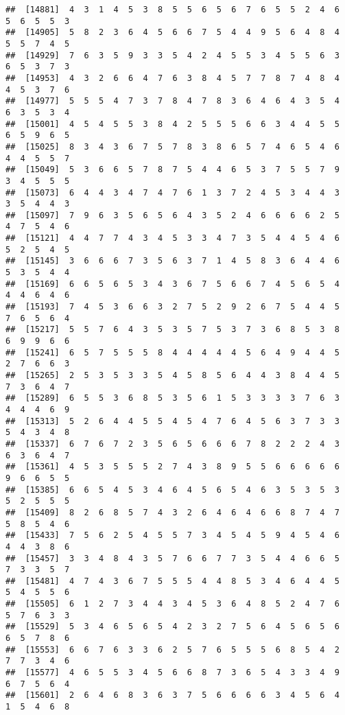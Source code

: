 \documentclass[
]{book}
\begin{document}
\begin{verbatim}
##  [14881]  4  3  1  4  5  3  8  5  5  6  5  6  7  6  5  5  2  4  6  5  6  5  5  3
##  [14905]  5  8  2  3  6  4  5  6  6  7  5  4  4  9  5  6  4  8  4  5  5  7  4  5
##  [14929]  7  6  3  5  9  3  3  5  4  2  4  5  5  3  4  5  5  6  3  6  5  3  7  3
##  [14953]  4  3  2  6  6  4  7  6  3  8  4  5  7  7  8  7  4  8  4  4  5  3  7  6
##  [14977]  5  5  5  4  7  3  7  8  4  7  8  3  6  4  6  4  3  5  4  6  3  5  3  4
##  [15001]  4  5  4  5  5  3  8  4  2  5  5  5  6  6  3  4  4  5  5  6  5  9  6  5
##  [15025]  8  3  4  3  6  7  5  7  8  3  8  6  5  7  4  6  5  4  6  4  4  5  5  7
##  [15049]  5  3  6  6  5  7  8  7  5  4  4  6  5  3  7  5  5  7  9  3  4  5  5  5
##  [15073]  6  4  4  3  4  7  4  7  6  1  3  7  2  4  5  3  4  4  3  3  5  4  4  3
##  [15097]  7  9  6  3  5  6  5  6  4  3  5  2  4  6  6  6  6  2  5  4  7  5  4  6
##  [15121]  4  4  7  7  4  3  4  5  3  3  4  7  3  5  4  4  5  4  6  5  2  5  4  5
##  [15145]  3  6  6  6  7  3  5  6  3  7  1  4  5  8  3  6  4  4  6  5  3  5  4  4
##  [15169]  6  6  5  6  5  3  4  3  6  7  5  6  6  7  4  5  6  5  4  4  4  6  4  6
##  [15193]  7  4  5  3  6  6  3  2  7  5  2  9  2  6  7  5  4  4  5  7  6  5  6  4
##  [15217]  5  5  7  6  4  3  5  3  5  7  5  3  7  3  6  8  5  3  8  6  9  9  6  6
##  [15241]  6  5  7  5  5  5  8  4  4  4  4  4  5  6  4  9  4  4  5  2  7  6  6  3
##  [15265]  2  5  3  5  3  3  5  4  5  8  5  6  4  4  3  8  4  4  5  7  3  6  4  7
##  [15289]  6  5  5  3  6  8  5  3  5  6  1  5  3  3  3  3  7  6  3  4  4  4  6  9
##  [15313]  5  2  6  4  4  5  5  4  5  4  7  6  4  5  6  3  7  3  3  5  4  3  4  8
##  [15337]  6  7  6  7  2  3  5  6  5  6  6  6  7  8  2  2  2  4  3  6  3  6  4  7
##  [15361]  4  5  3  5  5  5  2  7  4  3  8  9  5  5  6  6  6  6  6  9  6  6  5  5
##  [15385]  6  6  5  4  5  3  4  6  4  5  6  5  4  6  3  5  3  5  3  5  2  5  5  5
##  [15409]  8  2  6  8  5  7  4  3  2  6  4  6  4  6  6  8  7  4  7  5  8  5  4  6
##  [15433]  7  5  6  2  5  4  5  5  7  3  4  5  4  5  9  4  5  4  6  4  4  3  8  6
##  [15457]  3  3  4  8  4  3  5  7  6  6  7  7  3  5  4  4  6  6  5  7  3  3  5  7
##  [15481]  4  7  4  3  6  7  5  5  5  4  4  8  5  3  4  6  4  4  5  5  4  5  5  6
##  [15505]  6  1  2  7  3  4  4  3  4  5  3  6  4  8  5  2  4  7  6  5  7  6  3  3
##  [15529]  5  3  4  6  5  6  5  4  2  3  2  7  5  6  4  5  6  5  6  6  5  7  8  6
##  [15553]  6  6  7  6  3  3  6  2  5  7  6  5  5  5  6  8  5  4  2  7  7  3  4  6
##  [15577]  4  6  5  5  3  4  5  6  6  8  7  3  6  5  4  3  3  4  9  6  7  5  6  4
##  [15601]  2  6  4  6  8  3  6  3  7  5  6  6  6  6  3  4  5  6  4  1  5  4  6  8

\end{verbatim}
\end{document}
